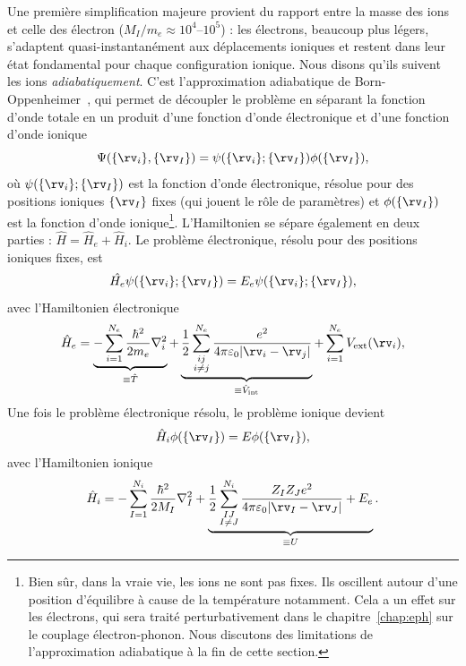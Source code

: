 Une première simplification majeure provient du rapport entre la masse des ions et celle des électron ($M_I/m_e \approx 10^4$--$10^5$) : les électrons, beaucoup plus légers, s'adaptent quasi-instantanément aux déplacements ioniques et restent dans leur état fondamental pour chaque configuration ionique. Nous disons qu'ils suivent les ions \textit{adiabatiquement}. C'est l'approximation adiabatique de Born-Oppenheimer~\cite{bornZurQuantentheorieMolekeln1927}, qui permet de découpler le problème en séparant la fonction d'onde totale en un produit d'une fonction d'onde électronique et d'une fonction d'onde ionique
\begin{equation}
    \Psi(\{\rv_i\},\{\rv_I\})=\psi(\{\rv_i\};\{\rv_I\})\phi(\{\rv_I\}),
    \label{eqn:c2_BO}
\end{equation}
où $\psi(\{\rv_i\};\{\rv_I\})$ est la fonction d'onde électronique, résolue pour des positions ioniques $\{\rv_I\}$ fixes (qui jouent le rôle de paramètres) et $\phi(\{\rv_I\})$ est la fonction d'onde ionique\footnote{Bien sûr, dans la vraie vie, les ions ne sont pas fixes. Ils oscillent autour d'une position d'équilibre à cause de la température notamment. Cela a un effet sur les électrons, qui sera traité perturbativement dans le chapitre~\ref{chap:eph} sur le couplage électron-phonon. Nous discutons des limitations de l'approximation adiabatique à la fin de cette section.}. L'Hamiltonien se sépare également en deux parties : $\hat{H}=\hat{H}_e+\hat{H}_i$. Le problème électronique, résolu pour des positions ioniques fixes, est
\begin{equation}
    \hat{H_e}\psi(\{\rv_i\};\{\rv_I\})=E_e\psi(\{\rv_i\};\{\rv_I\}),
    \label{eqn:c2_problème_électronique}
\end{equation}
avec l'Hamiltonien électronique
\begin{equation}
    \hat{H}_e=\underbrace{-\sum_{i=1}^{N_e}\frac{\hbar^2}{2m_e}\nabla_i^2}_{\equiv \hat{T}}+\underbrace{\frac{1}{2}\sum_{\substack{ij \\ i\neq j}}^{N_e}\frac{e^2}{4\pi\varepsilon_0|\rv_i-\rv_j|}}_{\equiv \hat{V}_\text{int}}+\sum_{i=1}^{N_e}V_\text{ext}(\rv_i),
    \label{eqn:c2_He}
\end{equation}
Une fois le problème électronique résolu, le problème ionique devient
\begin{equation}
    \hat{H}_i\phi(\{\rv_I\})=E\phi(\{\rv_I\}),
    \label{eqn:c2_problème_ionique}
\end{equation}
avec l'Hamiltonien ionique
\begin{equation}
    \hat{H}_i = -\sum_{I=1}^{N_i}\frac{\hbar^2}{2M_I}\nabla_I^2+\underbrace{\frac{1}{2}\sum_{\substack{IJ \\ I\neq J}}^{N_i}\frac{Z_IZ_Je^2}{4\pi\varepsilon_0|\rv_I-\rv_J|}+E_e}_{\equiv U}.
    \label{eqn:c2_Hi}
\end{equation}
